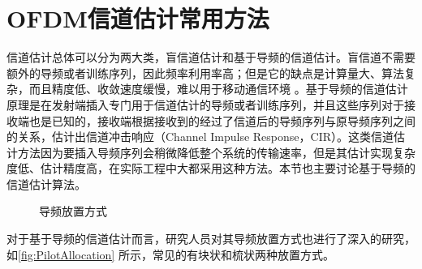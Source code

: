 \section{OFDM信道估计常用方法}
信道估计总体可以分为两大类，盲信道估计和基于导频的信道估计。盲信道不需要额外的导频或者训练序列，因此频率利用率高；但是它的缺点是计算量大、算法复杂，而且精度低、收敛速度缓慢，难以用于移动通信环境
\cite{石钧2012ofdm}。基于导频的信道估计原理是在发射端插入专门用于信道估计的导频或者训练序列，并且这些序列对于接收端也是已知的，接收端根据接收到的经过了信道后的导频序列与原导频序列之间的关系，估计出信道冲击响应（Channel Impulse Response，CIR）。这类信道估计方法因为要插入导频序列会稍微降低整个系统的传输速率，但是其估计实现复杂度低、估计精度高，在实际工程中大都采用这种方法。本节也主要讨论基于导频的信道估计算法。
\begin{figure}[htbp]
    \centering
    \caption{导频放置方式}
    \label{fig:PilotAllocation}
\end{figure}
对于基于导频的信道估计而言，研究人员对其导频放置方式也进行了深入的研究，如\autoref{fig:PilotAllocation} 所示，常见的有块状和梳状两种放置方式。

